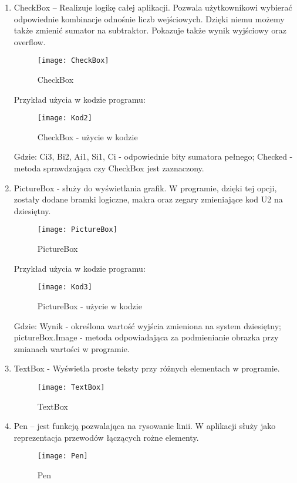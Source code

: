 \documentclass[12pt, a4paper, onside, polish]{article}				%
\begin{document}
 \begin{enumerate}
\item CheckBox – Realizuje logikę całej aplikacji. Pozwala użytkownikowi wybierać odpowiednie kombinacje odnośnie liczb wejściowych. Dzięki niemu możemy także zmienić sumator na subtraktor. Pokazuje także wynik wyjściowy oraz overflow. 
   	\begin{figure}[H]
  	  {\centering \texttt{[image: CheckBox]} \caption{CheckBox}}\vspace{5mm}
  	 \end{figure}
Przykład użycia w kodzie programu:
   	\begin{figure}[H]
  	  {\centering \texttt{[image: Kod2]} \caption{CheckBox - użycie w kodzie}}
  	\end{figure}
Gdzie: \newline
Ci3, Bi2, Ai1, Si1, Ci - odpowiednie bity sumatora pełnego; \newline
Checked - metoda sprawdzająca czy CheckBox jest zaznaczony. \newline


\item PictureBox - służy do wyświetlania grafik. W programie, dzięki tej opcji, zostały dodane bramki logiczne, makra oraz zegary zmieniające kod U2 na dziesiętny.
   	\begin{figure}[H]
  	  {\centering \texttt{[image: PictureBox]} \caption{PictureBox}}\vspace{5mm}
  	 \end{figure}
Przykład użycia w kodzie programu:
   	\begin{figure}[H]
  	  {\centering \texttt{[image: Kod3]} \caption{PictureBox - użycie w kodzie}}\vspace{5mm}
  	 \end{figure}
Gdzie: \newline
Wynik - określona wartość wyjścia zmieniona na system dziesiętny; \newline
pictureBox.Image - metoda odpowiadająca za podmienianie obrazka przy zmianach wartości w programie. \newline

\item TextBox - Wyświetla proste teksty przy różnych elementach w programie.  \newline
   	\begin{figure}[H]
  	  {\centering \texttt{[image: TextBox]} \caption{TextBox}}\vspace{5mm}
  	 \end{figure}
\item Pen – jest funkcją pozwalająca na rysowanie linii. W aplikacji służy jako reprezentacja przewodów łączących rożne elementy.  
   	\begin{figure}[H]
  	  {\centering \texttt{[image: Pen]} \caption{Pen}}\vspace{5mm}
  	 \end{figure}


\end{enumerate}
\end{document}
